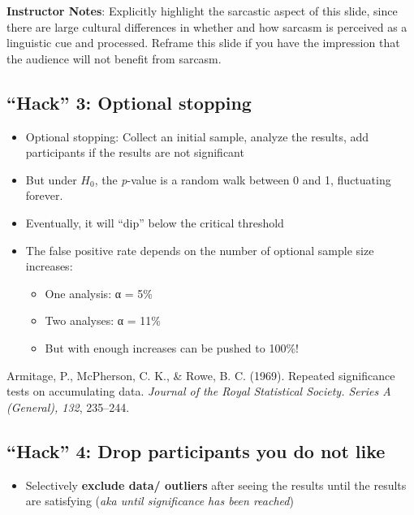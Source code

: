 \documentclass[
  letterpaper,
  DIV=11,
  numbers=noendperiod]{scrartcl}
\providecommand{\tightlist}{%
  \setlength{\itemsep}{0pt}\setlength{\parskip}{0pt}}
\begin{document}
\textbf{Instructor Notes}: Explicitly highlight the sarcastic aspect of
this slide, since there are large cultural differences in whether and
how sarcasm is perceived as a linguistic cue and processed. Reframe this
slide if you have the impression that the audience will not benefit from
sarcasm.

\subsection{``Hack'' 3: Optional
stopping}\label{hack-3-optional-stopping-1}

\begin{itemize}
\tightlist
\item
  Optional stopping: Collect an initial sample, analyze the results, add
  participants if the results are not significant
\item
  But under \(H_0\), the \emph{p}-value is a random walk between 0 and
  1, fluctuating forever.
\item
  Eventually, it will ``dip'' below the critical threshold
\item
  The false positive rate depends on the number of optional sample size
  increases:

  \begin{itemize}
  \tightlist
  \item
    One analysis: α = 5\%
  \item
    Two analyses: α = 11\%
  \item
    But with enough increases can be pushed to 100\%!
  \end{itemize}
\end{itemize}

Armitage, P., McPherson, C. K., \& Rowe, B. C. (1969). Repeated
significance tests on accumulating data. \emph{Journal of the Royal
Statistical Society. Series A (General), 132}, 235--244.

\subsection{``Hack'' 4: Drop participants you do not
like}\label{hack-4-drop-participants-you-do-not-like}

\begin{itemize}
\tightlist
\item
  Selectively \textbf{exclude data/ outliers} after seeing the results
  until the results are satisfying (\emph{aka until significance has
  been reached})
\end{itemize}
\end{document}
